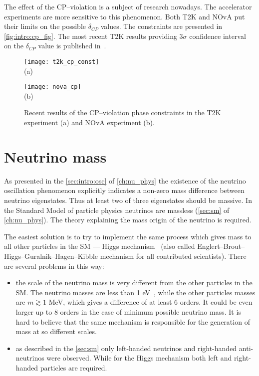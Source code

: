\documentclass[../main.tex]{subfiles}
\begin{document}
The effect of the CP--violation is a subject of research nowadays. The accelerator experiments are more sensitive to this phenomenon. Both T2K and NOvA put their limits on the possible $\delta_{CP}$ values. The constraints are presented in \autoref{fig:intro:cp_fig}. The most recent T2K results providing 3$\sigma$ confidence interval on the $\delta_{CP}$ value is published in~\cite{Abe2020n}.

\begin{figure}
  \centering
  \begin{minipage}{0.49\linewidth}
    \centering
    \texttt{[image: t2k\_cp\_const]} \\ (a)
  \end{minipage}
  \begin{minipage}{0.49\linewidth}
    \centering
    \texttt{[image: nova\_cp]} \\ (b)
  \end{minipage}
  \caption{Recent results of the CP--violation phase constraints in the T2K experiment (a)\cite{Abe2020n} and NOvA experiment (b)\cite{Acero2019}.}
  \label{fig:intro:cp_fig}

\end{figure}


\chapter{Neutrino mass}
\label{ch:intro:HNL}

As presented in the \autoref{sec:intro:osc} of \autoref{ch:nu_phys} the existence of the neutrino oscillation phenomenon explicitly indicates a non-zero mass difference between neutrino eigenstates. Thus at least two of three eigenstates should be massive. In the Standard Model of particle physics neutrinos are massless (\autoref{sec:sm} of  \autoref{ch:nu_phys}). The theory explaining the mass origin of the neutrino is required.

The easiest solution is to try to implement the same process which gives mass to all other particles in the SM --- Higgs mechanism~\cite{Higgs1964} (also called Englert–Brout–Higgs–Guralnik–Hagen–Kibble mechanism for all contributed scientists). There are several problems in this way:
\begin{itemize}
  \item the scale of the neutrino mass is very different from the other particles in the SM. The neutrino masses are less than 1 eV~\cite{Aker2019}, while the other particles masses are $m\gtrsim 1$ MeV, which gives a difference of at least 6 orders. It could be even larger up to 8 orders in the case of minimum possible neutrino mass. It is hard to believe that the same mechanism is responsible for the generation of mass at so different scales.
  \item as described in the \autoref{sec:sm} only left-handed neutrinos and right-handed anti-neutrinos were observed. While for the Higgs mechanism both left and right-handed particles are required.
\end{itemize}
\end{document}
